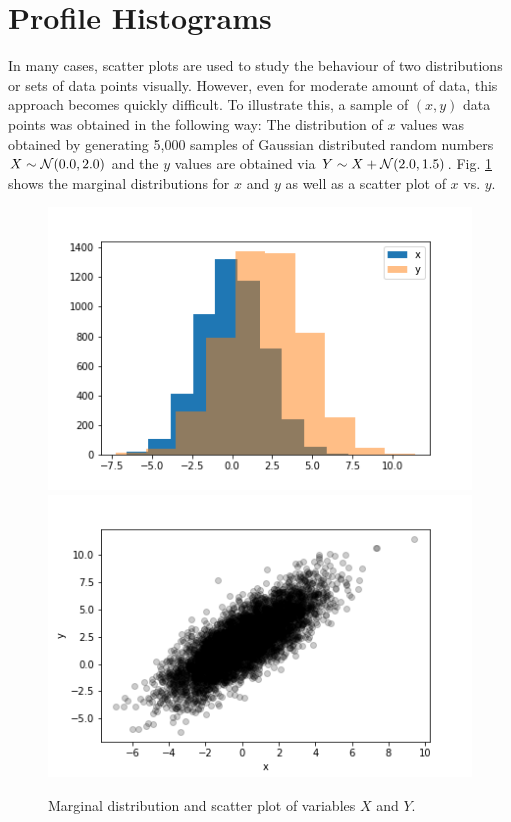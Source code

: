 \documentclass[BCOR=1mm, DIV=calc,10pt,
twoside=true,
twocolumn,
headings=normal]{scrartcl}
\newcommand{\fig}{Fig. }
\begin{document}



\appendix

\section{Profile Histograms}

In many cases, scatter plots are used to study the behaviour of two distributions or sets of data points visually. However, even for moderate amount of data, this approach becomes quickly difficult. To illustrate this, a sample of $(x,y)$ data points was obtained in the following way: The distribution of $x$ values was obtained by generating 5,000 samples of Gaussian distributed random numbers $X \sim {\cal N}(0.0,2.0)$ and the $y$ values are obtained via $Y \sim X +  {\cal N}(2.0,1.5)$. \fig \ref{fig:scatter} shows the marginal distributions for $x$ and $y$ as well as a scatter plot of $x$ vs. $y$.

\begin{figure}
\begin{center}
\includegraphics[scale=0.5]{../figures/marginal} \includegraphics[scale=0.5]{../figures/scatter}
\caption{\label{fig:scatter} Marginal distribution and scatter plot of variables $X$ and $Y$.}
\end{center}
\end{figure}
\end{document}
